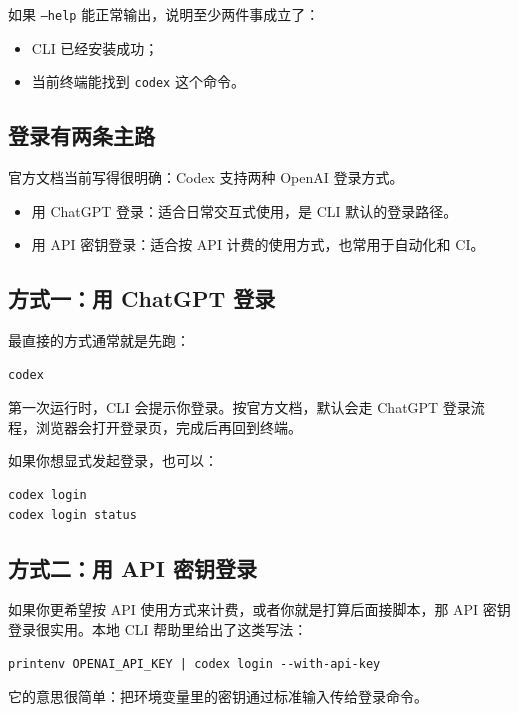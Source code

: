 \documentclass[UTF8,a4paper,12pt]{ctexart}
\begin{document}
如果 \texttt{--help} 能正常输出，说明至少两件事成立了：
\begin{itemize}
  \item CLI 已经安装成功；
  \item 当前终端能找到 \texttt{codex} 这个命令。
\end{itemize}

\subsection{登录有两条主路}

官方文档当前写得很明确：Codex 支持两种 OpenAI 登录方式。
\begin{itemize}
  \item 用 ChatGPT 登录：适合日常交互式使用，是 CLI 默认的登录路径。
  \item 用 API 密钥登录：适合按 API 计费的使用方式，也常用于自动化和 CI。
\end{itemize}

\subsection{方式一：用 ChatGPT 登录}

最直接的方式通常就是先跑：

\begin{lstlisting}[style=cli]
codex
\end{lstlisting}

第一次运行时，CLI 会提示你登录。按官方文档，默认会走 ChatGPT 登录流程，浏览器会打开登录页，完成后再回到终端。

如果你想显式发起登录，也可以：

\begin{lstlisting}[style=cli]
codex login
codex login status
\end{lstlisting}

\subsection{方式二：用 API 密钥登录}

如果你更希望按 API 使用方式来计费，或者你就是打算后面接脚本，那 API 密钥登录很实用。本地 CLI 帮助里给出了这类写法：

\begin{lstlisting}[style=cli]
printenv OPENAI_API_KEY | codex login --with-api-key
\end{lstlisting}

它的意思很简单：把环境变量里的密钥通过标准输入传给登录命令。
\end{document}
